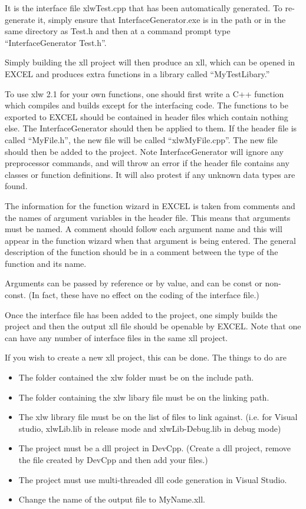 \documentclass[12pt,reqno]{amsart}
\numberwithin{equation}{section}
\numberwithin{figure}{section}
\begin{document}
It is the interface file xlwTest.cpp that has been automatically
generated. To re-generate it, simply ensure that
InterfaceGenerator.exe is in the path or in the same directory as
Test.h and then at a command prompt type ``InterfaceGenerator Test.h''. 

Simply building the xll project will then produce an xll, which can be
opened in EXCEL and produces extra functions in a library called
``MyTestLibary.'' 

To use xlw 2.1 for your own functions, one should first write a C++
function which compiles 
and builds except for the interfacing code. The functions to be
exported to EXCEL should be contained in header files which contain
nothing else. The InterfaceGenerator should then be applied to
them. If the header file is called ``MyFile.h'', the new file will be
called ``xlwMyFile.cpp''. The new file should then be added to the
project. Note InterfaceGenerator will ignore any preprocessor
commands, and will throw an error if the header file contains any
classes or function definitions. It will also protest if any unknown
data types are found. 

The information for the function wizard in EXCEL is taken from
comments and the names of argument variables in the header file. This
means that arguments must be named. A comment should follow each
argument name and this will appear in the function wizard when that
argument is being entered. The general description of the function
should be in a comment between the type of the function and its name. 

Arguments can be passed by reference or by value, and can be const or
non-const. (In fact, these have no effect on the coding of the
interface file.)

Once  the interface file has been added to the project, one simply
builds the project
and then the output xll file should be openable by EXCEL. Note that
one can
have any number of interface files in the same xll project. 

If you wish to create a new xll project, this can be done. The things
to do are 
\begin{itemize}
\item The folder contained the xlw folder must be on the include path.
\item The folder containing the xlw libary file must be on the linking
  path.
\item The xlw library file must be on the list of files to link
  against. (i.e. for Visual studio, 
 xlwLib.lib in release mode and xlwLib-Debug.lib in
  debug mode)
\item The project must be a dll project in DevCpp. (Create a dll
  project, remove the file created by DevCpp and then add your files.) 
\item The project must use multi-threaded dll code generation in
  Visual Studio. 
\item Change the name of the output file to MyName.xll. 
\end{itemize}
\end{document}
